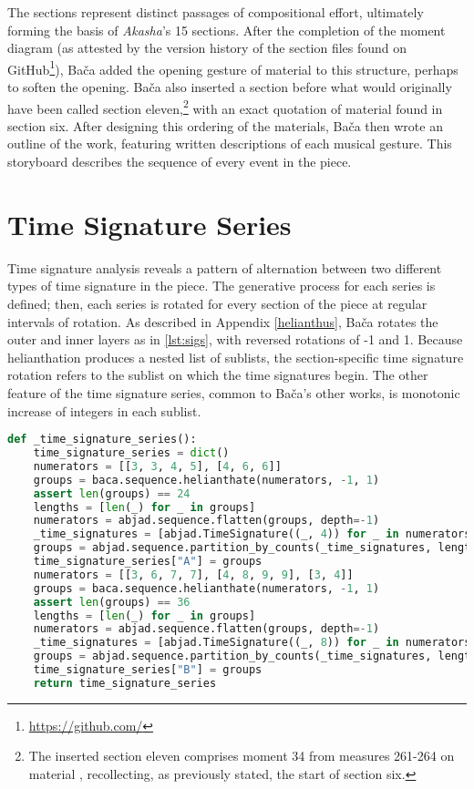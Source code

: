 The sections represent distinct passages of compositional effort, ultimately forming the basis of \textit{Akasha}'s 15 sections. After the completion of the moment diagram (as attested by the version history of the section files found on GitHub\footnote{\url{https://github.com/}}), Bača added the opening gesture of material  to this structure, perhaps to soften the opening. Bača also inserted a section before what would originally have been called section eleven,\footnote{The inserted section eleven comprises moment 34 from measures 261-264 on material , recollecting, as previously stated, the start of section six.} with an exact quotation of material found in section six. After designing this ordering of the materials, Bača then wrote an outline of the work, featuring written descriptions of each musical gesture. This storyboard describes the sequence of every event in the piece.

\section{Time Signature Series}

Time signature analysis reveals a pattern of alternation between two different types of time signature in the piece. The generative process for each series is defined; then, each series is rotated for every section of the piece at regular intervals of rotation. As described in Appendix \vref{helianthus}, Bača rotates the outer and inner layers as in \autoref{lst:sigs}, with reversed rotations of -1 and 1. Because helianthation produces a nested list of sublists, the section-specific time signature rotation refers to the sublist on which the time signatures begin. The other feature of the time signature series, common to Bača's other works, is monotonic increase of integers in each sublist.

\begin{lstlisting}[language=Python,frame=tb,caption={Definition of time signatures in \textit{Akasha}},label=lst:sigs]
def _time_signature_series():
    time_signature_series = dict()
    numerators = [[3, 3, 4, 5], [4, 6, 6]]
    groups = baca.sequence.helianthate(numerators, -1, 1)
    assert len(groups) == 24
    lengths = [len(_) for _ in groups]
    numerators = abjad.sequence.flatten(groups, depth=-1)
    _time_signatures = [abjad.TimeSignature((_, 4)) for _ in numerators]
    groups = abjad.sequence.partition_by_counts(_time_signatures, lengths)
    time_signature_series["A"] = groups
    numerators = [[3, 6, 7, 7], [4, 8, 9, 9], [3, 4]]
    groups = baca.sequence.helianthate(numerators, -1, 1)
    assert len(groups) == 36
    lengths = [len(_) for _ in groups]
    numerators = abjad.sequence.flatten(groups, depth=-1)
    _time_signatures = [abjad.TimeSignature((_, 8)) for _ in numerators]
    groups = abjad.sequence.partition_by_counts(_time_signatures, lengths)
    time_signature_series["B"] = groups
    return time_signature_series
\end{lstlisting}

